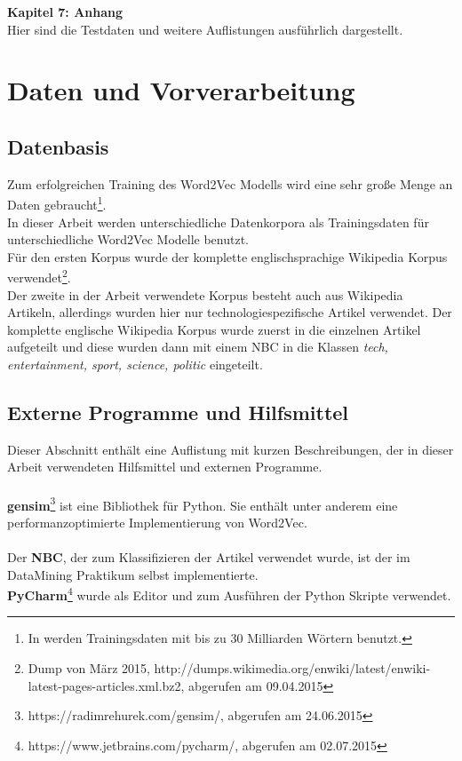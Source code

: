 \documentclass[12pt,a4paper]{report}
\begin{document}
	\textbf{Kapitel 7: Anhang}\\
	Hier sind die Testdaten und weitere Auflistungen ausführlich dargestellt.\\

\newpage
\chapter{Daten und Vorverarbeitung}
	\section{Datenbasis}
	Zum erfolgreichen Training des Word2Vec Modells wird eine sehr große Menge an Daten gebraucht\footnote{In \cite{DBLP:journals/corr/MikolovSCCD13} werden Trainingsdaten mit bis zu 30 Milliarden Wörtern benutzt.}. \\
	In dieser Arbeit werden unterschiedliche Datenkorpora als Trainingsdaten für unterschiedliche Word2Vec Modelle benutzt.\\	
	Für den ersten Korpus wurde der komplette englischsprachige Wikipedia Korpus verwendet\footnote{Dump von März 2015, http://dumps.wikimedia.org/enwiki/latest/enwiki-latest-pages-articles.xml.bz2, abgerufen am 09.04.2015}.\\
	Der zweite in der Arbeit verwendete Korpus besteht auch aus Wikipedia Artikeln, allerdings wurden hier nur technologiespezifische Artikel verwendet. Der komplette englische Wikipedia Korpus wurde zuerst in die einzelnen Artikel aufgeteilt und diese wurden dann mit einem NBC in die Klassen \textit{tech, entertainment, sport, science, politic} eingeteilt.\\
	


	\section{Externe Programme und Hilfsmittel}
	Dieser Abschnitt enthält eine Auflistung mit kurzen Beschreibungen, der in dieser Arbeit verwendeten Hilfsmittel und externen Programme.\\
	\vspace{1em}\\	
	\textbf{gensim}\cite{rehurek_lrec}\footnote{https://radimrehurek.com/gensim/, abgerufen am 24.06.2015} ist eine Bibliothek für Python. Sie enthält unter anderem eine performanzoptimierte Implementierung von Word2Vec.\\ 
	\vspace{1em}\\
	Der \textbf{NBC}, der zum Klassifizieren der Artikel verwendet wurde, ist der im DataMining Praktikum selbst implementierte.
	\vspace{1em}\\
	\textbf{PyCharm}\footnote{https://www.jetbrains.com/pycharm/, abgerufen am 02.07.2015} wurde als Editor und zum Ausführen der Python Skripte verwendet.
	
\end{document}
